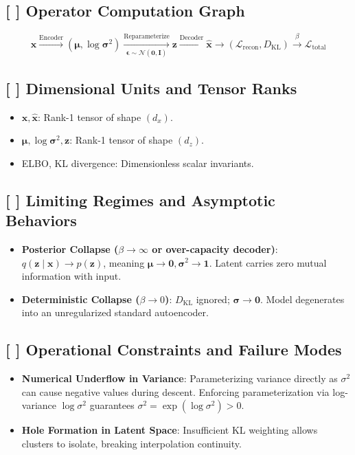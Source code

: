 \documentclass[11pt,a4paper]{article}
\theoremstyle{definition}
\begin{document}
\subsection{[ ] Operator Computation Graph}
{\boldmath
\begin{equation}
\mathbf{x} \xrightarrow{\text{Encoder}} (\boldsymbol{\mu}, \log \boldsymbol{\sigma}^2) \xrightarrow[\boldsymbol{\epsilon} \sim \mathcal{N}(\mathbf{0}, \mathbf{I})]{\text{Reparameterize}} \mathbf{z} \xrightarrow{\text{Decoder}} \hat{\mathbf{x}} \longrightarrow (\mathcal{L}_{\text{recon}}, D_{\text{KL}}) \xrightarrow{\beta} \mathcal{L}_{\text{total}}
\end{equation}
}

\subsection{[ ] Dimensional Units and Tensor Ranks}
\begin{itemize}
    \item $\mathbf{x}, \hat{\mathbf{x}}$: Rank-1 tensor of shape $(d_x)$.
    \item $\boldsymbol{\mu}, \log \boldsymbol{\sigma}^2, \mathbf{z}$: Rank-1 tensor of shape $(d_z)$.
    \item ELBO, KL divergence: Dimensionless scalar invariants.
\end{itemize}

\subsection{[ ] Limiting Regimes and Asymptotic Behaviors}
\begin{itemize}
    \item \textbf{Posterior Collapse ($\beta \to \infty$ or over-capacity decoder)}: $q(\mathbf{z} \mid \mathbf{x}) \to p(\mathbf{z})$, meaning $\boldsymbol{\mu} \to \mathbf{0}, \boldsymbol{\sigma}^2 \to \mathbf{1}$. Latent carries zero mutual information with input.
    \item \textbf{Deterministic Collapse ($\beta \to 0$)}: $D_{\text{KL}}$ ignored; $\boldsymbol{\sigma} \to \mathbf{0}$. Model degenerates into an unregularized standard autoencoder.
\end{itemize}

\subsection{[ ] Operational Constraints and Failure Modes}
\begin{itemize}
    \item \textbf{Numerical Underflow in Variance}: Parameterizing variance directly as $\sigma^2$ can cause negative values during descent. Enforcing parameterization via log-variance $\log \sigma^2$ guarantees $\sigma^2 = \exp(\log \sigma^2) > 0$.
    \item \textbf{Hole Formation in Latent Space}: Insufficient KL weighting allows clusters to isolate, breaking interpolation continuity.
\end{itemize}
\end{document}
